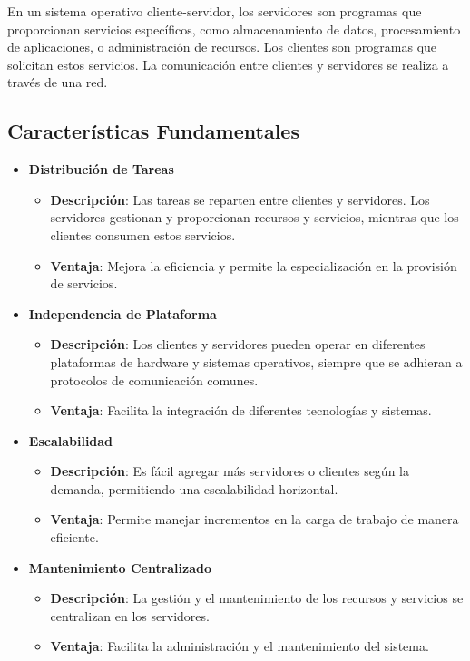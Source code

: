 En un sistema operativo cliente-servidor, los servidores son programas que proporcionan servicios específicos, como almacenamiento de datos, procesamiento de aplicaciones, o administración de recursos. Los clientes son programas que solicitan estos servicios. La comunicación entre clientes y servidores se realiza a través de una red.

\subsection{Características Fundamentales}

\begin{itemize}
	\item \textbf{Distribución de Tareas}
	\begin{itemize}
		\item \textbf{Descripción}: Las tareas se reparten entre clientes y servidores. Los servidores gestionan y proporcionan recursos y servicios, mientras que los clientes consumen estos servicios.
		\item \textbf{Ventaja}: Mejora la eficiencia y permite la especialización en la provisión de servicios.
	\end{itemize}
	
	\item \textbf{Independencia de Plataforma}
	\begin{itemize}
		\item \textbf{Descripción}: Los clientes y servidores pueden operar en diferentes plataformas de hardware y sistemas operativos, siempre que se adhieran a protocolos de comunicación comunes.
		\item \textbf{Ventaja}: Facilita la integración de diferentes tecnologías y sistemas.
	\end{itemize}
	
	\item \textbf{Escalabilidad}
	\begin{itemize}
		\item \textbf{Descripción}: Es fácil agregar más servidores o clientes según la demanda, permitiendo una escalabilidad horizontal.
		\item \textbf{Ventaja}: Permite manejar incrementos en la carga de trabajo de manera eficiente.
	\end{itemize}
	
	\item \textbf{Mantenimiento Centralizado}
	\begin{itemize}
		\item \textbf{Descripción}: La gestión y el mantenimiento de los recursos y servicios se centralizan en los servidores.
		\item \textbf{Ventaja}: Facilita la administración y el mantenimiento del sistema.
	\end{itemize}
\end{itemize}

